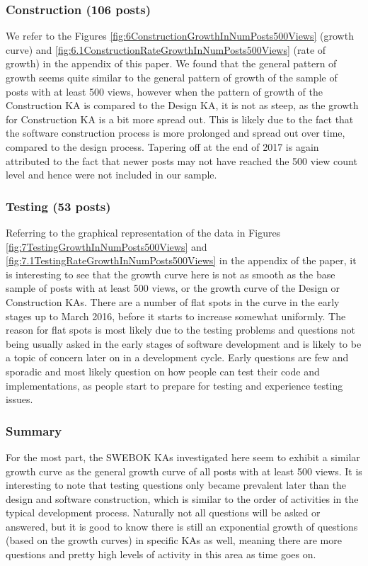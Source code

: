 \documentclass{sigchi}
\begin{document}
\subsubsection{Construction (106 posts)}
We refer to the Figures \ref{fig:6ConstructionGrowthInNumPosts500Views} (growth curve) and \ref{fig:6.1ConstructionRateGrowthInNumPosts500Views} (rate of growth) in the appendix of this paper. We found that the general pattern of growth seems quite similar to the general pattern of growth of the sample of posts with at least 500 views, however when the pattern of growth of the Construction KA is compared to the Design KA, it is not as steep, as the growth for Construction KA is a bit more spread out. This is likely due to the fact that the software construction process is more prolonged and spread out over time, compared to the design process. Tapering off at the end of 2017 is again attributed to the fact that newer posts may not have reached the 500 view count level and hence were not included in our sample. 

\subsubsection{Testing (53 posts)}
Referring to the graphical representation of the data in Figures \ref{fig:7TestingGrowthInNumPosts500Views} and \ref{fig:7.1TestingRateGrowthInNumPosts500Views} in the appendix of the paper, it is interesting to see that the growth curve here is not as smooth as the base sample of posts with at least 500 views, or the growth curve of the Design or Construction KAs. There are a number of flat spots in the curve in the early stages up to March 2016, before it starts to increase somewhat uniformly. The reason for flat spots is most likely due to the testing problems and questions not being usually asked in the early stages of software development and is likely to be a topic of concern later on in a development cycle. Early questions are few and sporadic and most likely question on how people can test their code and implementations, as people start to prepare for testing and experience testing issues.
\subsubsection{Summary}
For the most part, the SWEBOK KAs investigated here seem to exhibit a similar growth curve as the general growth curve of all posts with at least 500 views. It is interesting to note that testing questions only became prevalent later than the design and software construction, which is similar to the order of activities in the typical development process. Naturally not all questions will be asked or answered, but it is good to know there is still an exponential growth of questions (based on the growth curves) in specific KAs as well, meaning there are more questions and pretty high levels of activity in this area as time goes on.
\end{document}
